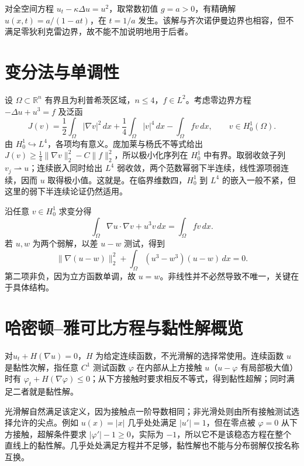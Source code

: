 \documentclass[UTF8,12pt,a4paper,fontset=fandol]{ctexbook}
\begin{document}
\begin{example}
对全空间方程 $u_t-\kappa\Delta u=u^2$，取常数初值 $g=a>0$，有精确解 $u(x,t)=a/(1-at)$，在 $t=1/a$ 发生。该解与齐次诺伊曼边界也相容，但不满足零狄利克雷边界，故不能不加说明地用于后者。
\end{example}

\section{变分法与单调性}
设 $\Omega\subset\mathbb R^n$ 有界且为利普希茨区域，$n\le4$，$f\in L^2$。考虑零边界方程 $-\Delta u+u^3=f$ 及泛函
\begin{equation}
 J(v)=\frac12\int_\Omega|\nabla v|^2\,dx+
      \frac14\int_\Omega|v|^4\,dx-\int_\Omega fv\,dx,
 \qquad v\in H_0^1(\Omega).
 \label{eq:nonlinear-functional}
\end{equation}
由 $H_0^1\hookrightarrow L^4$，各项均有意义。庞加莱与杨氏不等式给出 $J(v)\ge\frac14\|\nabla v\|_2^2-C\|f\|_2^2$，所以极小化序列在 $H_0^1$ 中有界。取弱收敛子列 $v_j\rightharpoonup u$；连续嵌入同时给出 $L^4$ 弱收敛，两个范数幂弱下半连续，线性源项弱连续，因而 $u$ 取得极小值。这就是。在临界维数四，$H_0^1$ 到 $L^4$ 的嵌入一般不紧，但这里的弱下半连续论证仍然适用。

沿任意 $v\in H_0^1$ 求变分得
\[
 \int_\Omega\nabla u\cdot\nabla v+u^3v\,dx=\int_\Omega fv\,dx.
\]
若 $u,w$ 为两个弱解，以差 $u-w$ 测试，得到
\[
 \|\nabla(u-w)\|_2^2+\int_\Omega(u^3-w^3)(u-w)\,dx=0.
\]
第二项非负，因为立方函数单调，故 $u=w$。非线性并不必然导致不唯一，关键在于具体结构。

\section{哈密顿--雅可比方程与黏性解概览}
对$u_t+H(\nabla u)=0$，$H$ 为给定连续函数，不光滑解的选择常使用。连续函数 $u$ 是黏性次解，指任意 $C^1$ 测试函数 $\varphi$ 在内部从上方接触 $u$（$u-\varphi$ 有局部极大值）时有 $\varphi_t+H(\nabla\varphi)\le0$；从下方接触时要求相反不等式，得到黏性超解；同时满足二者就是黏性解。

光滑解自然满足该定义，因为接触点一阶导数相同；非光滑处则由所有接触测试选择允许的尖点。例如 $u(x)=|x|$ 几乎处处满足 $|u'|=1$，但在零点被 $\varphi=0$ 从下方接触，超解条件要求 $|\varphi'|-1\ge0$，实际为 $-1$，所以它不是该稳态方程在整个直线上的黏性解。几乎处处满足方程并不足够，黏性解也不能与分布弱解仅按名称互换。
\end{document}
